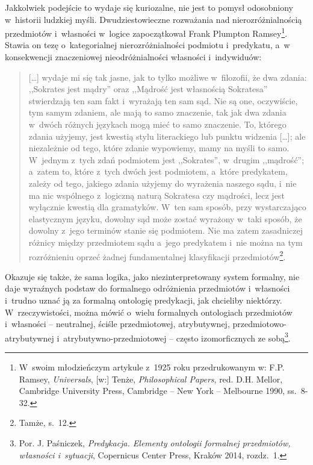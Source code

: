 Jakkolwiek podejście to wydaje się kuriozalne, nie jest to pomysł odosobniony w~historii ludzkiej myśli. Dwudziestowieczne rozważania nad nierozróżnialnością przedmiotów i~własności w~logice zapoczątkował Frank Plumpton Ramsey\footnote{W~swoim młodzieńczym artykule z~1925 roku przedrukowanym w: F.P. Ramsey, \textit{Universals}, [w:] Tenże, \textit{Philosophical Papers}, red. D.H. Mellor, Cambridge University Press, Cambridge -- New York -- Melbourne 1990, ss.~8-32.}. Stawia on tezę o~kategorialnej nierozróżnialności podmiotu i~predykatu, a~w konsekwencji znaczeniowej nieodróżnialności własności i~indywiduów:

\begin{quote}
[\ldots] wydaje mi się tak jasne, jak to tylko możliwe w~filozofii, że dwa zdania: ,,Sokrates jest mądry'' oraz ,,Mądrość jest własnością Sokratesa'' stwierdzają ten sam fakt i~wyrażają ten sam sąd. Nie są one, oczywiście, tym samym zdaniem, ale mają to samo znaczenie, tak jak dwa zdania w~dwóch różnych językach mogą mieć to samo znaczenie. To, którego zdania użyjemy, jest kwestią stylu literackiego lub punktu widzenia [\ldots]; ale niezależnie od tego, które zdanie wypowiemy, mamy na myśli to samo. W~jednym z~tych zdań podmiotem jest ,,Sokrates'', w~drugim ,,mądrość''; a~zatem to, które z~tych dwóch jest podmiotem, a~które predykatem, zależy od tego, jakiego zdania użyjemy do wyrażenia naszego sądu, i~nie ma nic wspólnego z~logiczną naturą Sokratesa czy mądrości, lecz jest wyłącznie kwestią dla gramatyków. W~ten sam sposób, przy wystarczająco elastycznym języku, dowolny sąd może zostać wyrażony w~taki sposób, że dowolny z~jego terminów stanie się podmiotem. Nie ma zatem zasadniczej różnicy między przedmiotem sądu a~jego predykatem i~nie można na tym rozróżnieniu oprzeć żadnej fundamentalnej klasyfikacji przedmiotów\footnote{Tamże, s.~12.}.
\end{quote}
Okazuje się także, że sama logika, jako niezinterpretowany system formalny, nie daje wyraźnych podstaw do formalnego odróżnienia przedmiotów i~własności i~trudno uznać ją za formalną ontologię predykacji, jak chcieliby niektórzy. W~rzeczywistości, można mówić o~wielu formalnych ontologiach przedmiotów i~własności -- neutralnej, ściśle przedmiotowej, atrybutywnej, przedmiotowo-atrybutywnej i~atrybutywno-przedmiotowej -- często izomorficznych ze sobą\footnote{Por. J. Paśniczek, \textit{Predykacja. Elementy ontologii formalnej przedmiotów, własności i~sytuacji}, Copernicus Center Press, Kraków 2014, rozdz.~1.}.

